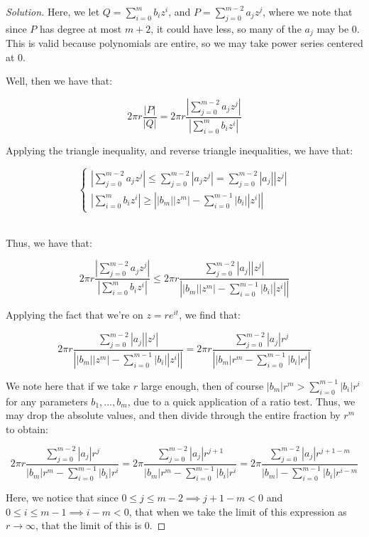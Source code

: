 \documentclass[10pt]{article}
\begin{document}
\begin{proof}[Solution]
Here, we let $Q = \sum_{i=0}^m b_i z^i$, and $P = \sum_{j=0}^{m-2} a_j z^j$, where we note that since $P$ has degree at most $m+2$, it could have less, so many of the $a_j$ may be 0. This is valid because polynomials are entire, so we may take power series centered at 0.

Well, then we have that:

$$2 \pi r \frac{|P|}{|Q|} = 2 \pi r \frac{\left|  \sum_{j=0}^{m-2} a_j z^j \right|}{ \left|\sum_{i=0}^m b_i z^i\right|}$$

Applying the triangle inequality, and reverse triangle inequalities, we have that:

$$\begin{cases}  \left|  \sum_{j=0}^{m-2} a_j z^j \right| \leq \sum_{j=0}^{m-2} |a_j z^j| = \sum_{j=0}^{m-2} |a_j| | z^j| \\  \left|\sum_{i=0}^m b_i z^i\right| \geq \left| |b_m||z^m| - \sum_{i=0}^{m-1} |b_i| |z^i| \right| \end{cases}$$\

Thus, we have that:

$$  2 \pi r \frac{\left|  \sum_{j=0}^{m-2} a_j z^j \right|}{ \left|\sum_{i=0}^m b_i z^i\right|} \leq 2 \pi r \frac{ \sum_{j=0}^{m-2} |a_j| | z^j|}{\left| |b_m||z^m| - \sum_{i=0}^{m-1} |b_i| |z^i| \right|}$$

Applying the fact that we're on $z = re^{it}$, we find that:

$$ 2 \pi r \frac{ \sum_{j=0}^{m-2} |a_j| | z^j|}{\left| |b_m||z^m| - \sum_{i=0}^{m-1} |b_i| |z^i| \right|} =  2 \pi r \frac{ \sum_{j=0}^{m-2} |a_j| r^j}{\left| |b_m|r^m - \sum_{i=0}^{m-1} |b_i|r^i \right|}$$

We note here that if we take $r$ large enough, then of course $|b_m| r^m > \sum_{i=0}^{m-1} |b_i|r^i$ for any parameters $b_1,...,b_m$, due to a quick application of a ratio test. Thus, we may drop the absolute values, and then divide through the entire fraction by $r^m$ to obtain:

$$ 2 \pi r \frac{ \sum_{j=0}^{m-2} |a_j| r^j}{ |b_m|r^m - \sum_{i=0}^{m-1} |b_i|r^i } = 2 \pi \frac{ \sum_{j=0}^{m-2} |a_j| r^{j+1}}{ |b_m|r^m - \sum_{i=0}^{m-1} |b_i|r^i }  = 2 \pi \frac{ \sum_{j=0}^{m-2} |a_j| r^{j+1 - m}}{ |b_m| - \sum_{i=0}^{m-1} |b_i|r^{i-m }} $$

Here, we notice that since $0 \leq j \leq m-2 \implies j+1 -m < 0$ and $0 \leq i \leq m-1 \implies i -m < 0$, that when we take the limit of this expression as $r \to \infty$, that the limit of this is 0.


\end{proof}
\end{document}
